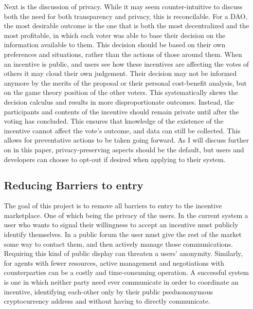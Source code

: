\documentclass{article}
\begin{document}
Next is the discussion of privacy. While it may seem counter-intuitive to discuss both the need for both transparency and privacy, this is reconcilable. For a DAO, the most desirable outcome is the one that is both the most decentralized and the most profitable, in which each voter was able to base their decision on the information available to them. This decision should be based on their own preferences and situations, rather than the actions of those around them. When an incentive is public, and users see how these incentives are affecting the votes of others it may cloud their own judgement. Their decision may not be informed anymore by the merits of the proposal or their personal cost-benefit analysis, but on the game theory position of the other voters. This systematically skews the decision calculus and results in more disproportionate outcomes. Instead, the participants and contents of the incentive should remain private until after the voting has concluded. This ensures that knowledge of the existence of the incentive cannot affect the vote's outcome, and data can still be collected. This allows for preventative actions to be taken going forward. As I will discuss further on in this paper, privacy-preserving aspects should be the default, but users and developers can choose to opt-out if desired when applying to their system.   

\subsection{Reducing Barriers to entry}
The goal of this project is to remove all barriers to entry to the incentive marketplace. One of which being the privacy of the users. In the current system a user who wants to signal their willingness to accept an incentive must publicly identify themselves. In a public forum the user must give the rest of the market some way to contact them, and then actively manage those communications. Requiring this kind of public display can threaten a users' anonymity. Similarly, for agents with fewer resources, active management and negotiations with counterparties can be a costly and time-consuming operation. A successful system is one in which neither party need ever communicate in order to coordinate an incentive, identifying each-other only by their public pseduononymous cryptocurrency address and without having to directly communicate. 
\end{document}
